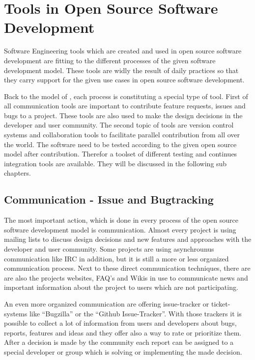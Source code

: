 \documentclass[DIV=calc,paper=a4,fontsize=9pt,twocolumn]{scrartcl}
\begin{document}
\section{Tools in Open Source Software Development}

Software Engineering tools which are created and used in open source software development are fitting to the different processes of the given software development model. These tools are widly the result of daily practices so that they carry support for the given use cases in open source software development. \citep{Robbins02adoptingoss} 

Back to the model of \citet{Haddad11}, each process is constituting a special type of tool. First of all communication tools are important to contribute feature requests, issues and bugs to a project. These tools are also used to make the design decisions in the developer and user community. The second topic of tools are version control systems and collaboration tools to facilitate parallel contribution from all over the world. The software need to be tested according to the given open source model after contribution. Therefor a toolset of different testing and continues integration tools are available. They will be discussed in the following sub chapters.

\subsection{Communication - Issue and Bugtracking}

The most important action, which is done in every process of the open source software development model is communication. Almost every project is using mailing lists to discuss design decisions and new features and approaches with the developer and user community. Some projects are using asynchrounus communication like IRC in addition, but it is still a more or less organized communication process. Next to these direct communication techniques, there are are also the projects websites, FAQ's and Wikis in use to communicate news and important information about the project to users which are not participating. \citep{ApacheFoundation13} 

An even more organized communication are offering issue-tracker or ticket-systems like \enquote{Bugzilla} or the \enquote{Github Issue-Tracker}. With those trackers it is possible to collect a lot of information from users and developers about bugs, reports, features and ideas and they offer also a way to rate or prioritize them. After a decision is made by the community each report can be assigned to a special developer or group which is solving or implementing the made decision.
\end{document}
